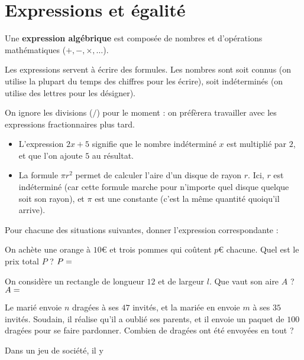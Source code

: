 \documentclass{poly}
\begin{document}
\section{Expressions et égalité}
\begin{definition}
Une \textbf{expression algébrique} est composée de nombres et d'opérations mathématiques ($+, -, \times, \dots$).
\end{definition}
Les expressions servent à écrire des formules. Les nombres sont soit connus (on utilise la plupart du temps des chiffres pour les écrire), soit indéterminés (on utilise des lettres pour les désigner).
\begin{remark}
On ignore les divisions ($/$) pour le moment : on préfèrera travailler avec les expressions fractionnaires plus tard.
\end{remark}
\begin{example}
\hfill
\begin{itemize}
\item L'expression $2x + 5$ signifie que le nombre indéterminé $x$ est multiplié par $2$, et que l'on ajoute $5$ au résultat.
\item La formule $\pi r^2$ permet de calculer l'aire d'un disque de rayon $r$. Ici, $r$ est indéterminé (car cette formule marche pour n'importe quel disque quelque soit son rayon), et $\pi$ est une constante (c'est la même quantité quoiqu'il arrive).
\end{itemize}
\end{example}
\begin{exercize}
Pour chacune des situations suivantes, donner l'expression correspondante :
\begin{alphaquestions}
\item On achète une orange à $10$€ et trois pommes qui coûtent $p$€ chacune. Quel est le prix total $P$ ? $P = \answerline{}$
\item On considère un rectangle de longueur $12$ et de largeur $l$. Que vaut son aire $A$ ? $A = \answerline$
\item Le marié envoie $n$ dragées à ses $47$ invités, et la mariée en envoie $m$ à ses $35$ invités. Soudain, il réalise qu'il a oublié ses parents, et il envoie un paquet de $100$ dragées pour se faire pardonner. Combien de dragées ont été envoyées en tout ? \answerline
\item Dans un jeu de société, il y 
\end{alphaquestions}
\end{exercize}

\newpage
\end{document}
